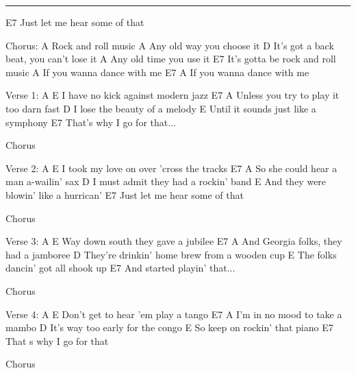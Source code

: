 \noindent\rule{\columnwidth}{1pt}
\begin{multicols}{2}
\begin{lstsong}
E7
Just let me hear some of that

Chorus:
A
Rock and roll music
A
Any old way you choose it
           D           
It's got a back beat, you can't lose it
A
Any old time you use it
     E7
It's gotta be rock and roll music
                        A
If you wanna dance with me
E7                      A
If you wanna dance with me

Verse 1:
A                      E
I have no kick against modern jazz
E7                          A
  Unless you try to play it too darn fast
                       D
I lose the beauty of a melody
                            E
Until it sounds just like a symphony
E7
That's why I go for that...

Chorus









Verse 2:
A                       E
I took my love on over 'cross the tracks
E7                        A
So she could hear a man a-wailin' sax
                        D
I must admit they had a rockin' band
                             E
And they were blowin' like a hurrican'
E7
Just let me hear some of that

Chorus

Verse 3:
A                          E
Way down south they gave a jubilee
E7                            A
And Georgia folks, they had a jamboree
                                  D
They're drinkin' home brew from a wooden cup
                      E
The folks dancin' got all shook up
E7
And started playin' that...

Chorus

Verse 4:
A                            E
Don't get to hear 'em play a tango
E7                       A
I'm in no mood to take a mambo
                           D
It's way too early for the congo
                        E
So keep on rockin' that piano
E7
That s why I go for that

Chorus
\end{lstsong}
\end{multicols}
\newpage

